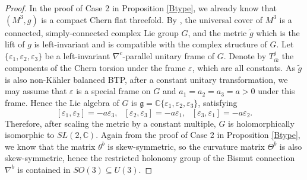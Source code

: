 \documentclass{amsart}
\numberwithin{equation}{section}
\theoremstyle{definition}
\renewcommand{\1}{\mathds{1}}
\renewcommand{\>}{\rightarrow}
\begin{document}
\begin{proof}
In the proof of Case 2 in Proposition \ref{Btype}, we already know that $(M^3,g)$ is a compact Chern flat threefold. By \cite{Boothby}, the universal cover of $M^3$ is a connected, simply-connected complex Lie group $G$, and the metric $\tilde{g}$ which is the lift of $g$ is  left-invariant and is  compatible with the complex structure of $G$. Let $\{ \varepsilon_1, \varepsilon_2, \varepsilon_3\}$ be a left-invariant $\nabla^c$-parallel unitary frame of $G$. Denote by $T^j_{ik}$ the components of the Chern torsion under the frame $\varepsilon$, which are all constants. As $\tilde{g}$ is also non-K\"ahler balanced  BTP, after a constant unitary transformation, we may assume that $\varepsilon$ is a special frame on $G$ and $a_1=a_2=a_3=a>0$ under this frame. Hence the Lie algebra of $G$ is ${\mathfrak g}={\mathbb C}\{ \varepsilon_1,\varepsilon_2,\varepsilon_3\}$, satisfying
$$ [\varepsilon_1,\varepsilon_2]=-a\varepsilon_3, \ \ \ [\varepsilon_2,\varepsilon_3]=-a\varepsilon_1, \ \ \ [\varepsilon_3,\varepsilon_1]=-a\varepsilon_2. $$
Therefore, after scaling the metric by a constant multiple, $G$ is holomorphically isomorphic to $SL(2,{\mathbb C})$. Again from the proof of Case 2 in Proposition \ref{Btype},  we know that the matrix $\theta^b$ is skew-symmetric, so the curvature matrix $\Theta^b$ is also skew-symmetric, hence the restricted holonomy group of the Bismut connection $\nabla^b$ is contained in $SO(3)\subseteq U(3)$.


\end{proof}
\end{document}

